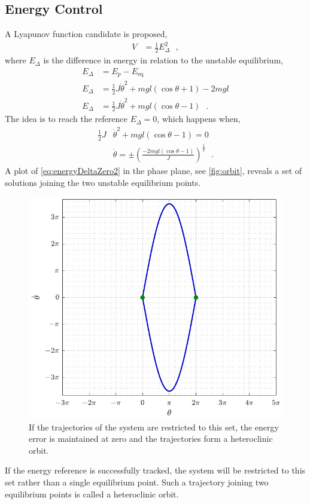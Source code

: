 \subsection{Energy Control}
A Lyapunov function candidate is proposed,
\begin{align}
  V &= \tfrac{1}{2} E_\Delta ^2 \ \ \ ,   \label{eq:lyapunovCandidate} 
\end{align}
where $E_\Delta$ is the difference in energy in relation to the unstable equilibrium,
%
\begin{align}
  E_\Delta &= E_p  - E_{\mathrm{eq}}   \label{eq:energyDelta1} \\
  E_\Delta &= \tfrac{1}{2} J \dot{\theta}^2 + m g l (\cos \theta +1) - 2 m g l  \label{eq:energyDelta2} \\
  E_\Delta &= \tfrac{1}{2} J \dot{\theta}^2 + m g l (\cos \theta -1)   \ \ \ .  \label{eq:energyDelta3}
\end{align}
%
The idea is to reach the reference $E_\Delta = 0$, which happens when,
\begin{align}
  \tfrac{1}{2} J &\dot{\theta}^2 + m g l (\cos \theta -1) = 0 \label{eq:energyDeltaZero1} \\
  &\dot{\theta} = \pm \left(\frac{-2 m g l (\cos \theta -1)}{J}\right)^{\tfrac{1}{2}}  \ \ \ .  \label{eq:energyDeltaZero2}
\end{align}
%
A plot of \autoref{eq:energyDeltaZero2} in the phase plane, see \autoref{fig:orbit}, reveals a set of solutions joining the two unstable equilibrium points.
%
\begin{figure}[H]
  \includegraphics[width=.4\textwidth]{figures/orbit}
  \caption{If the trajectories of the system are restricted to this set, the energy error is maintained at zero and the trajectories form a heteroclinic orbit.}
  \label{fig:orbit}
\end{figure}
%
If the energy reference is successfully tracked, the system will be restricted to this set rather than a single equilibrium point. Such a trajectory joining two equilibrium points is called a heteroclinic orbit.\\
